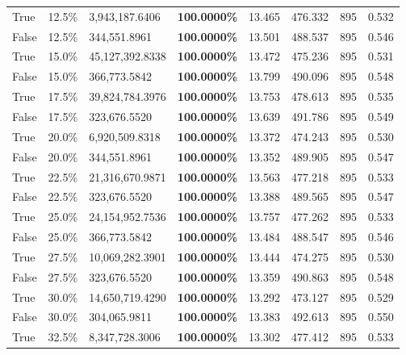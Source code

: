 \begin{table}[H]
\begin{tabular}{lllrllll}
\cline{1-8}
True & 12.5\% & 3,943,187.6406 & \bfseries \color{red} 100.0000\% & 13.465 & 476.332 & 895 & 0.532 \\
\cline{1-8}
False & 12.5\% & 344,551.8961 & \bfseries \color{red} 100.0000\% & 13.501 & 488.537 & 895 & 0.546 \\
\cline{1-8}
True & 15.0\% & 45,127,392.8338 & \bfseries \color{red} 100.0000\% & 13.472 & 475.236 & 895 & 0.531 \\
\cline{1-8}
False & 15.0\% & 366,773.5842 & \bfseries \color{red} 100.0000\% & 13.799 & 490.096 & 895 & 0.548 \\
\cline{1-8}
True & 17.5\% & 39,824,784.3976 & \bfseries \color{red} 100.0000\% & 13.753 & 478.613 & 895 & 0.535 \\
\cline{1-8}
False & 17.5\% & 323,676.5520 & \bfseries \color{red} 100.0000\% & 13.639 & 491.786 & 895 & 0.549 \\
\cline{1-8}
True & 20.0\% & 6,920,509.8318 & \bfseries \color{red} 100.0000\% & 13.372 & 474.243 & 895 & 0.530 \\
\cline{1-8}
False & 20.0\% & 344,551.8961 & \bfseries \color{red} 100.0000\% & 13.352 & 489.905 & 895 & 0.547 \\
\cline{1-8}
True & 22.5\% & 21,316,670.9871 & \bfseries \color{red} 100.0000\% & 13.563 & 477.218 & 895 & 0.533 \\
\cline{1-8}
False & 22.5\% & 323,676.5520 & \bfseries \color{red} 100.0000\% & 13.388 & 489.565 & 895 & 0.547 \\
\cline{1-8}
True & 25.0\% & 24,154,952.7536 & \bfseries \color{red} 100.0000\% & 13.757 & 477.262 & 895 & 0.533 \\
\cline{1-8}
False & 25.0\% & 366,773.5842 & \bfseries \color{red} 100.0000\% & 13.484 & 488.547 & 895 & 0.546 \\
\cline{1-8}
True & 27.5\% & 10,069,282.3901 & \bfseries \color{red} 100.0000\% & 13.444 & 474.275 & 895 & 0.530 \\
\cline{1-8}
False & 27.5\% & 323,676.5520 & \bfseries \color{red} 100.0000\% & 13.359 & 490.863 & 895 & 0.548 \\
\cline{1-8}
True & 30.0\% & 14,650,719.4290 & \bfseries \color{red} 100.0000\% & 13.292 & 473.127 & 895 & 0.529 \\
\cline{1-8}
False & 30.0\% & 304,065.9811 & \bfseries \color{red} 100.0000\% & 13.383 & 492.613 & 895 & 0.550 \\
\cline{1-8}
True & 32.5\% & 8,347,728.3006 & \bfseries \color{red} 100.0000\% & 13.302 & 477.412 & 895 & 0.533 \\

\end{tabular}
\end{table}
